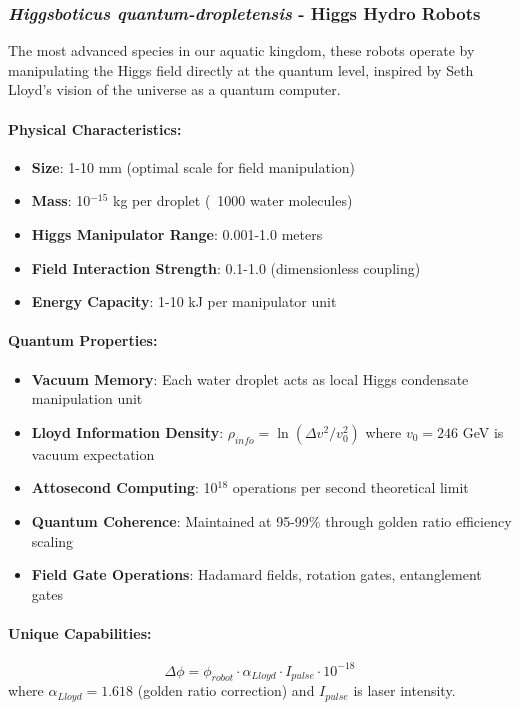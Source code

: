 \documentclass[11pt,a4paper]{article}
\begin{document}
\subsubsection{\textit{Higgsboticus quantum-dropletensis} - Higgs Hydro Robots}
The most advanced species in our aquatic kingdom, these robots operate by manipulating the Higgs field directly at the quantum level, inspired by Seth Lloyd's vision of the universe as a quantum computer.

\paragraph{Physical Characteristics:}
\begin{itemize}
    \item \textbf{Size}: 1-10 mm (optimal scale for field manipulation)
    \item \textbf{Mass}: 10$^{-15}$ kg per droplet (~1000 water molecules)
    \item \textbf{Higgs Manipulator Range}: 0.001-1.0 meters
    \item \textbf{Field Interaction Strength}: 0.1-1.0 (dimensionless coupling)
    \item \textbf{Energy Capacity}: 1-10 kJ per manipulator unit
\end{itemize}

\paragraph{Quantum Properties:}
\begin{itemize}
    \item \textbf{Vacuum Memory}: Each water droplet acts as local Higgs condensate manipulation unit
    \item \textbf{Lloyd Information Density}: $\rho_{info} = \ln(\Delta v^2 / v_0^2)$ where $v_0 = 246$ GeV is vacuum expectation
    \item \textbf{Attosecond Computing}: 10$^{18}$ operations per second theoretical limit
    \item \textbf{Quantum Coherence}: Maintained at 95-99\% through golden ratio efficiency scaling
    \item \textbf{Field Gate Operations}: Hadamard fields, rotation gates, entanglement gates
\end{itemize}

\paragraph{Unique Capabilities:}
\begin{equation}
\Delta \phi = \phi_{robot} \cdot \alpha_{Lloyd} \cdot I_{pulse} \cdot 10^{-18}
\end{equation}
where $\alpha_{Lloyd} = 1.618$ (golden ratio correction) and $I_{pulse}$ is laser intensity.
\end{document}
